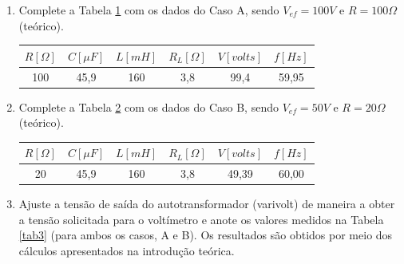 \documentclass[a4paper,12pt,oneside,openany,table,xcdraw]{article}
\begin{document}
\begin{enumerate}[1 - ]
\item Complete a Tabela \ref{tab1} com os dados do Caso A, sendo $V_{ef}=100V$ e $R=100\Omega$ (teórico).

\begin{table}[h]
\centering
\def\arraystretch{1.35}
\captionsetup{font=scriptsize}
 \label{tab1}
\begin{tabular}{|c|c|c|c|c|c|}
\hline
$R [\Omega]$ & $C [\mu F]$ & $L [mH]$ & $R_L [\Omega]$ & $V [volts]$ & $f [Hz]$ \\ \hline
       100      &    45,9     &    160      &         3,8       &      99,4       &     59,95     \\ \hline
\end{tabular}
\end{table}

\item Complete a Tabela \ref{tab2} com os dados do Caso B, sendo $V_{ef}=50V$ e $R=20\Omega$ (teórico).

\begin{table}[h]
\centering
\def\arraystretch{1.35}
\captionsetup{font=scriptsize}
 \label{tab2}
\begin{tabular}{|c|c|c|c|c|c|}
\hline
$R [\Omega]$ & $C [\mu F]$ & $L [mH]$ & $R_L [\Omega]$ & $V [volts]$ & $f [Hz]$ \\ \hline
       20      &    45,9     &    160      &         3,8       &       49,39      &     60,00     \\ \hline
\end{tabular}
\end{table}

\item Ajuste a tensão de saída do autotransformador (varivolt) de maneira a obter a tensão solicitada para o voltímetro e anote os valores medidos na Tabela \ref{tab3} (para ambos os casos, A e B). Os resultados são obtidos por meio dos cálculos apresentados na introdução teórica.
\begin{table}[H]
\centering
\def\arraystretch{1.35}
\captionsetup{font=scriptsize}
 \label{tab3}


\end{table}
\end{enumerate}
\end{document}
